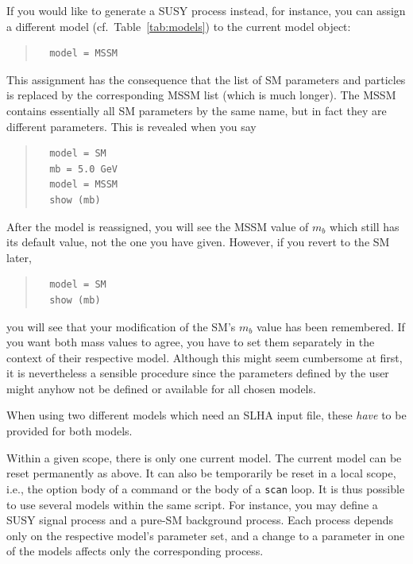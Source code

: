 \documentclass[12pt]{book}
\newcommand{\ttt}[1]{\texttt{#1}}
\begin{document}
If you would like to generate a SUSY process instead, for instance, you can
assign a different model (cf.\ Table~\ref{tab:models}) to the current model
object:
\begin{quote}
\begin{footnotesize}
\begin{verbatim}
  model = MSSM
\end{verbatim}
\end{footnotesize}
\end{quote}
This assignment has the consequence that the list of SM parameters and
particles is replaced by the corresponding MSSM list (which is much longer).
The MSSM contains essentially all SM parameters by the same name, but in fact
they are different parameters.  This is revealed when you say
\begin{quote}
\begin{footnotesize}
\begin{verbatim}
  model = SM
  mb = 5.0 GeV
  model = MSSM
  show (mb)
\end{verbatim}
\end{footnotesize}
\end{quote}
After the model is reassigned, you will see the MSSM value of $m_b$ which
still has its default value, not the one you have given.  However, if you
revert to the SM later,
\begin{quote}
\begin{footnotesize}
\begin{verbatim}
  model = SM
  show (mb)
\end{verbatim}
\end{footnotesize}
\end{quote}
you will see that your modification of the SM's $m_b$ value has been
remembered.  If you want both mass values to agree, you have to set them
separately in the context of their respective model.  Although this might seem
cumbersome at first, it is nevertheless a sensible procedure since the
parameters defined by the user might anyhow not be defined or available for
all chosen models.

When using two different models which need an SLHA input file,
these {\em have} to be provided for both models.

Within a given scope, there is only one current model.  The current model can
be reset permanently as above.  It can also be temporarily be reset in a local
scope, i.e., the option body of a command or the body of a \ttt{scan} loop.
It is thus possible to use several models within the same script.  For
instance, you may define a SUSY signal process and a pure-SM background
process. Each process depends only on the respective model's parameter set,
and a change to a parameter in one of the models affects only the
corresponding process.
\end{document}
